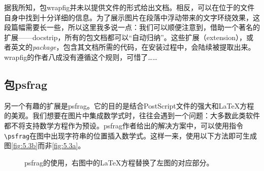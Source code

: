 据我所知，包\textsf{wrapfig}并未以提供文件的形式给出文档。相反，可以在位于的文件自身中找到十分详细的信息。为了展示图片在段落中浮动带来的文字环绕效果，这段篇幅需要长一些，所以这里我多说一点：我们可以顺便注意到，借助一个著名的扩展——\textsf{docstrip}，所有的包文档都可以“自动归纳”。这些扩展（extension），或者英文的\emph{package}，包含其文档所需的代码，在安装过程中，会陆续被提取出来。\textsf{wrapfig}的作者八成没有遵循这个规则，可惜了……

\subsection{包\textsf{psfrag}}

另一个有趣的扩展是\textsf{psfrag}。它的目的是结合PostScript文件的强大和\LaTeX 方程的美观。我们想要在图片中集成数学式时，往往会遇到一个问题：大多数此类软件都不将支持数学方程作为预设。\textsf{psfrag}作者给出的解决方案中，可以使用指令\verb|\psfrag|在图中出现字符串的位置插入数学式。这样一来，使用以下方法即可生成图\ref{fig:5.3b}而非\ref{fig:5.3a}。
% 
% 

\begin{figure}[ht]
  \begin{center}
      \leavevmode {}
      \hspace{2cm} 
    \caption{\textsf{psfrag}的使用，右图中的\LaTeX 方程替换了左图的对应部分。}%
    \label{fig:5.3}
  \end{center}
\end{figure}


